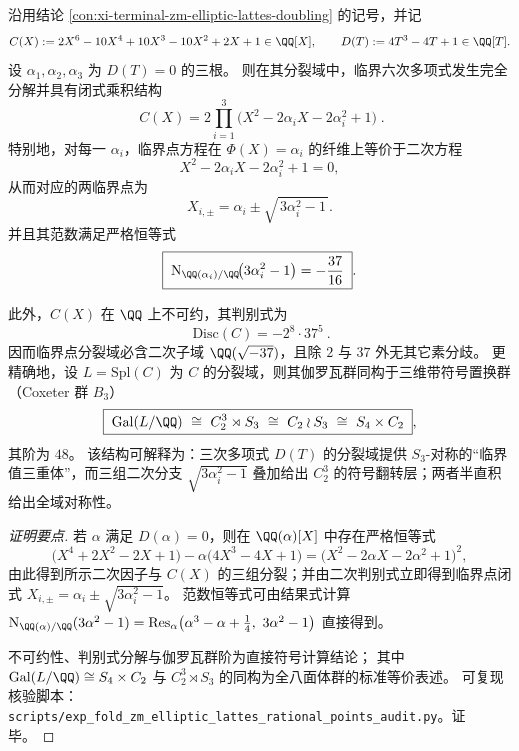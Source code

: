 \begin{conclusion}\label{con:xi-terminal-zm-elliptic-lattes-critical-sextic-galois}
沿用结论 \ref{con:xi-terminal-zm-elliptic-lattes-doubling} 的记号，并记
\[
C(X):=2X^{6}-10X^{4}+10X^{3}-10X^{2}+2X+1\in\QQ[X],
\qquad
D(T):=4T^{3}-4T+1\in\QQ[T].
\]
设 \(\alpha_{1},\alpha_{2},\alpha_{3}\) 为 \(D(T)=0\) 的三根。
则在其分裂域中，临界六次多项式发生完全分解并具有闭式乘积结构
\[
\boxed{\;
C(X)=2\prod_{i=1}^{3}\bigl(X^{2}-2\alpha_{i}X-2\alpha_{i}^{2}+1\bigr)\; }.
\]
特别地，对每一 \(\alpha_i\)，临界点方程在 \(\Phi(X)=\alpha_i\) 的纤维上等价于二次方程
\[
X^{2}-2\alpha_{i}X-2\alpha_{i}^{2}+1=0,
\]
从而对应的两临界点为
\[
X_{i,\pm}=\alpha_{i}\pm\sqrt{\,3\alpha_{i}^{2}-1\,}.
\]
并且其范数满足严格恒等式
\[
\boxed{\;
\operatorname{N}_{\QQ(\alpha_{i})/\QQ}\!\bigl(3\alpha_{i}^{2}-1\bigr)=-\frac{37}{16}\; }.
\]
\par
此外，\(C(X)\) 在 \(\QQ\) 上不可约，其判别式为
\[
\boxed{\ \mathrm{Disc}(C)=-2^{8}\cdot 37^{5}\ }.
\]
因而临界点分裂域必含二次子域 \(\QQ(\sqrt{-37})\)，且除 \(2\) 与 \(37\) 外无其它素分歧。
更精确地，设 \(L=\mathrm{Spl}(C)\) 为 \(C\) 的分裂域，则其伽罗瓦群同构于三维带符号置换群（Coxeter 群 \(B_{3}\)）
\[
\boxed{\;
\mathrm{Gal}(L/\QQ)\ \cong\ C_{2}^{3}\rtimes S_{3}\ \cong\ C_{2}\wr S_{3}\ \cong\ S_{4}\times C_{2}\; } ,
\]
其阶为 \(48\)。
该结构可解释为：三次多项式 \(D(T)\) 的分裂域提供 \(S_{3}\)-对称的“临界值三重体”，而三组二次分支 \(\sqrt{3\alpha_{i}^{2}-1}\) 叠加给出 \(C_{2}^{3}\) 的符号翻转层；两者半直积给出全域对称性。
\end{conclusion}
\begin{proof}[证明要点]
若 \(\alpha\) 满足 \(D(\alpha)=0\)，则在 \(\QQ(\alpha)[X]\) 中存在严格恒等式
\[
\bigl(X^{4}+2X^{2}-2X+1\bigr)-\alpha\bigl(4X^{3}-4X+1\bigr)=\bigl(X^{2}-2\alpha X-2\alpha^{2}+1\bigr)^{2},
\]
由此得到所示二次因子与 \(C(X)\) 的三组分裂；并由二次判别式立即得到临界点闭式
\(
X_{i,\pm}=\alpha_i\pm\sqrt{3\alpha_i^{2}-1}
\)。
范数恒等式可由结果式计算
\(
\operatorname{N}_{\QQ(\alpha)/\QQ}(3\alpha^{2}-1)=\mathrm{Res}_{\alpha}\bigl(\alpha^{3}-\alpha+\tfrac14,\ 3\alpha^{2}-1\bigr)
\)
直接得到。
\par
不可约性、判别式分解与伽罗瓦群阶为直接符号计算结论；
其中 \(\mathrm{Gal}(L/\QQ)\cong S_{4}\times C_{2}\) 与 \(C_{2}^{3}\rtimes S_{3}\) 的同构为全八面体群的标准等价表述。
可复现核验脚本：\texttt{scripts/exp\_fold\_zm\_elliptic\_lattes\_rational\_points\_audit.py}。证毕。
\end{proof}

